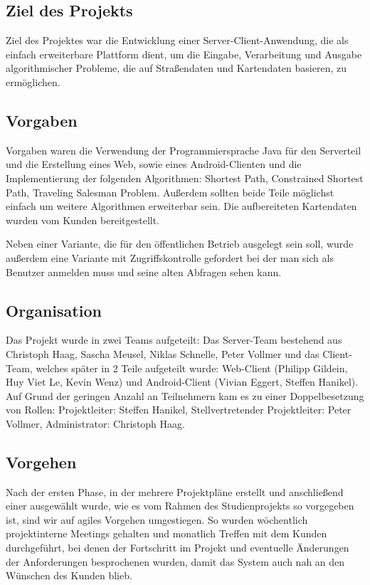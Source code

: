 \subsection*{Ziel des Projekts}

Ziel des Projektes war die Entwicklung einer Server-Client-Anwendung, die als einfach erweiterbare Plattform dient, um die Eingabe, Verarbeitung und Ausgabe algorithmischer Probleme, die auf Straßendaten und Kartendaten basieren, zu ermöglichen.

\subsection*{Vorgaben}

Vorgaben waren die Verwendung der Programmiersprache Java für den Serverteil und die Erstellung eines Web, sowie eines Android-Clienten und die Implementierung der folgenden Algorithmen: Shortest Path, Constrained Shortest Path, Traveling Salesman Problem. Außerdem sollten beide Teile möglichst einfach um weitere Algorithmen erweiterbar sein. Die aufbereiteten Kartendaten wurden vom Kunden bereitgestellt.

Neben einer Variante, die für den öffentlichen Betrieb ausgelegt sein soll, wurde außerdem eine Variante mit Zugriffskontrolle gefordert bei der man sich als Benutzer anmelden muss und seine alten Abfragen sehen kann.

\subsection*{Organisation}

Das Projekt wurde in zwei Teams aufgeteilt: Das Server-Team bestehend aus Christoph Haag, Sascha Meusel, Niklas Schnelle, Peter Vollmer und das Client-Team, welches später in 2 Teile aufgeteilt wurde: Web-Client (Philipp Gildein, Huy Viet Le, Kevin Wenz) und Android-Client (Vivian Eggert, Steffen Hanikel). Auf Grund der geringen Anzahl an Teilnehmern kam es zu einer Doppelbesetzung von Rollen: Projektleiter: Steffen Hanikel, Stellvertretender Projektleiter: Peter Vollmer, Administrator: Christoph Haag.

\subsection*{Vorgehen}

Nach der ersten Phase, in der mehrere Projektpläne erstellt und anschließend einer ausgewählt wurde, wie es vom Rahmen des Studienprojekts so vorgegeben ist, sind wir auf agiles Vorgehen umgestiegen. So wurden wöchentlich projektinterne Meetings gehalten und monatlich Treffen mit dem Kunden durchgeführt, bei denen der Fortschritt im Projekt und eventuelle Änderungen der Anforderungen besprochenen wurden, damit das System auch nah an den Wünschen des Kunden blieb.

